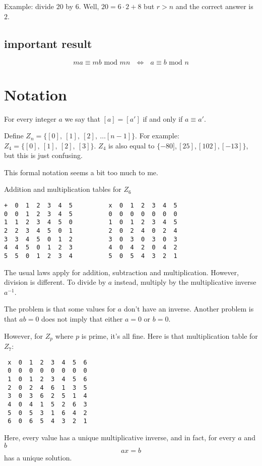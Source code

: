 \documentclass[11pt, oneside]{article}
\begin{document}
Example:  divide $20$ by $6$.  Well, $20 = 6 \cdot 2 + 8$ but $r > n$ and the correct answer is $2$. 

\subsection*{important result}
\[ ma \equiv mb \text{ mod } mn \ \ \  \iff \ \ \ a \equiv b \text{ mod } n \]

\section*{Notation}
For every integer $a$ we say that $[a] = [a']$ if and only if $a \equiv a'$.

Define $Z_n = \{ [0], \ [1], \ [2], \ \dots [n-1] \}$. For example:  $Z_4 = \{ [0],\ [1], \ [2], \ [3] \}$.  $Z_4$ is also equal to $\{−80],[25],[102],[−13]\}$, but this is just confusing.

This formal notation seems a bit too much to me.

Addition and multiplication tables for $Z_6$

\begin{verbatim}
+  0  1  2  3  4  5          x  0  1  2  3  4  5
0  0  1  2  3  4  5          0  0  0  0  0  0  0
1  1  2  3  4  5  0          1  0  1  2  3  4  5
2  2  3  4  5  0  1          2  0  2  4  0  2  4
3  3  4  5  0  1  2          3  0  3  0  3  0  3
4  4  5  0  1  2  3          4  0  4  2  0  4  2
5  5  0  1  2  3  4          5  0  5  4  3  2  1
\end{verbatim}

The usual laws apply for addition, subtraction and multiplication.  However, division is different.  To divide by $a$ instead, multiply by the multiplicative inverse $a^{-1}$.

The problem is that some values for $a$ don't have an inverse.  Another problem is that $ab = 0$ does not imply that either $a = 0$ or $b = 0$.

However, for $Z_p$ where $p$ is prime, it's all fine.  Here is that multiplication table for $Z_7$:

\begin{verbatim}
 x  0  1  2  3  4  5  6
 0  0  0  0  0  0  0  0
 1  0  1  2  3  4  5  6
 2  0  2  4  6  1  3  5
 3  0  3  6  2  5  1  4
 4  0  4  1  5  2  6  3  
 5  0  5  3  1  6  4  2 
 6  0  6  5  4  3  2  1
\end{verbatim}

Here, every value has a unique multiplicative inverse, and in fact, for every $a$ and $b$
\[ ax = b \]
has a unique solution.
\end{document}
